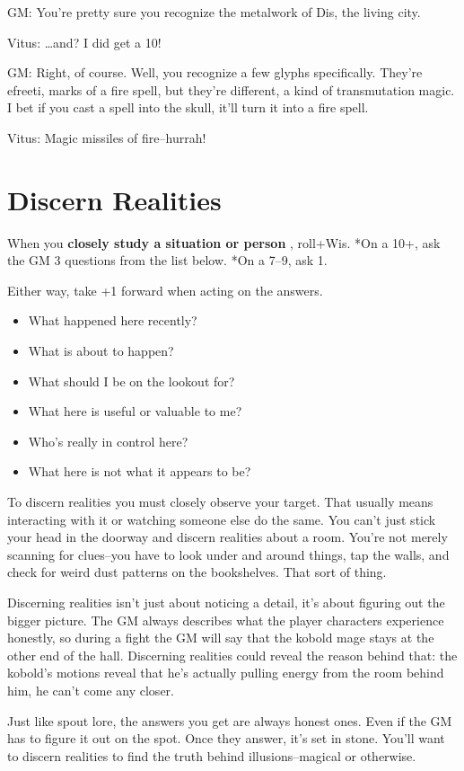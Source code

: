  GM: You're pretty sure you recognize the metalwork of Dis, the living city.


 Vitus:  \ldots and? I did get a 10!


 GM: Right, of course. Well, you recognize a few glyphs specifically. They're efreeti, marks of a fire spell, but they're different, a kind of transmutation magic. I bet if you cast a spell into the skull, it'll turn it into a fire spell.


 Vitus: Magic missiles of fire--hurrah!
\section{Discern Realities}


 When you \textbf{closely study a situation or person}
, roll+Wis. *On a 10+, ask the GM 3 questions from the list below. *On a 7--9, ask 1.


 Either way, take +1 forward when acting on the answers.
\begin{itemize}
\item What happened here recently?
\item What is about to happen?
\item What should I be on the lookout for?
\item What here is useful or valuable to me?
\item Who's really in control here?
\item What here is not what it appears to be?

\end{itemize}


 To discern realities you must closely observe your target. That usually means interacting with it or watching someone else do the same. You can't just stick your head in the doorway and discern realities about a room. You're not merely scanning for clues--you have to look under and around things, tap the walls, and check for weird dust patterns on the bookshelves. That sort of thing.


 Discerning realities isn't just about noticing a detail, it's about figuring out the bigger picture. The GM always describes what the player characters experience honestly, so during a fight the GM will say that the kobold mage stays at the other end of the hall. Discerning realities could reveal the reason behind that: the kobold's motions reveal that he's actually pulling energy from the room behind him, he can't come any closer.


 Just like spout lore, the answers you get are always honest ones. Even if the GM has to figure it out on the spot. Once they answer, it's set in stone. You'll want to discern realities to find the truth behind illusions--magical or otherwise.


